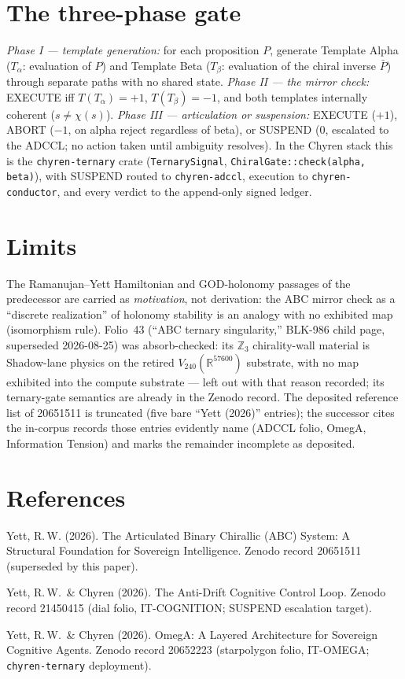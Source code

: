 \documentclass{alienfolio}
\begin{document}
\section{The three-phase gate}
\emph{Phase I --- template generation:} for each proposition $P$, generate
Template Alpha ($T_\alpha$: evaluation of $P$) and Template Beta ($T_\beta$:
evaluation of the chiral inverse $\bar{P}$) through separate paths with no
shared state. \emph{Phase II --- the mirror check:} EXECUTE iff
$T(T_\alpha) = +1$, $T(T_\beta) = -1$, and both templates internally coherent
($s \neq \chi(s)$). \emph{Phase III --- articulation or suspension:} EXECUTE
($+1$), ABORT ($-1$, on alpha reject regardless of beta), or SUSPEND ($0$,
escalated to the ADCCL; no action taken until ambiguity resolves). In the
Chyren stack this is the \texttt{chyren-ternary} crate
(\texttt{TernarySignal}, \texttt{ChiralGate::check(alpha, beta)}), with
SUSPEND routed to \texttt{chyren-adccl}, execution to
\texttt{chyren-conductor}, and every verdict to the append-only signed
ledger.

\section{Limits}
The Ramanujan--Yett Hamiltonian and GOD-holonomy passages of the predecessor
are carried as \emph{motivation}, not derivation: the ABC mirror check as a
``discrete realization'' of holonomy stability is an analogy with no
exhibited map (isomorphism rule). Folio~43 (``ABC ternary singularity,''
BLK-986 child page, superseded 2026-08-25) was absorb-checked: its
$\mathbb{Z}_3$ chirality-wall material is Shadow-lane physics on the retired
$V_{240}(\mathbb{R}^{57600})$ substrate, with no map exhibited into the
compute substrate --- left out with that reason recorded; its ternary-gate
semantics are already in the Zenodo record. The deposited reference list of
20651511 is truncated (five bare ``Yett (2026)'' entries); the successor
cites the in-corpus records those entries evidently name (ADCCL folio,
OmegA, Information Tension) and marks the remainder incomplete as deposited.

\section*{References}
Yett, R.\,W. (2026). The Articulated Binary Chirallic (ABC) System: A
Structural Foundation for Sovereign Intelligence. Zenodo record 20651511
(superseded by this paper).

Yett, R.\,W.\ \& Chyren (2026). The Anti-Drift Cognitive Control Loop.
Zenodo record 21450415 (dial folio, IT-COGNITION; SUSPEND escalation
target).

Yett, R.\,W.\ \& Chyren (2026). OmegA: A Layered Architecture for Sovereign
Cognitive Agents. Zenodo record 20652223 (starpolygon folio, IT-OMEGA;
\texttt{chyren-ternary} deployment).
\end{document}
